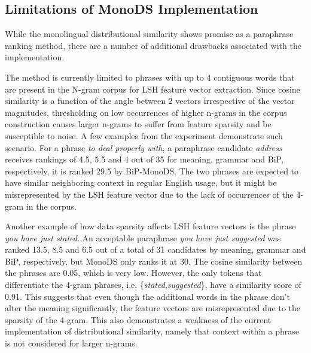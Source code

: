 \documentclass[11pt]{article}
\newcommand{\mnote}[1]{\marginpar{\raggedleft\footnotesize\itshape#1}}
\begin{document}
{{ 
\subsection{Limitations of MonoDS Implementation}%

While the monolingual distributional similarity shows promise as a paraphrase ranking method, there are a number of additional drawbacks associated with the implementation.%

The method is currently limited to phrases with up to 4 contiguous words that are present in the N-gram corpus for LSH feature vector extraction. Since cosine similarity is a function of the angle between 2 vectors irrespective of the vector magnitudes, thresholding on low occurrences of higher n-grams in the corpus construction causes larger n-grams to suffer from feature sparsity and be susceptible to noise. A few examples from the experiment demonstrate such scenario. For a phrase \emph{to deal properly with}, a paraphrase candidate \emph{address} receives rankings of 4.5, 5.5 and 4 out of 35 for meaning, grammar and BiP, respectively, it is ranked 29.5 by BiP-MonoDS. The two phrases are expected to have similar neighboring context in regular English usage, but it might be misrepresented by the LSH feature vector due to the lack of occurrences of the 4-gram in the corpus.

Another example of how data sparsity affects LSH feature vectors is the phrase \emph{you have just stated}. An acceptable paraphrase \emph{you have just suggested} was ranked 13.5, 8.5 and 6.5 out of a total of 31 candidates by meaning, grammar and BiP, respectively, but MonoDS only ranks it at 30. The cosine similarity between the phrases are 0.05, which is very low. However, the only tokens that differentiate the 4-gram phrases, i.e. \{\emph{stated},\emph{suggested}\}, have a similarity score of 0.91. This suggests that even though the additional words in the phrase don't alter the meaning significantly, the feature vectors are misrepresented due to the sparsity of the 4-gram. This also demonstrates a weakness of the current implementation of distributional similarity, namely that context within a phrase is not considered for larger n-grams.

}}
\end{document}
